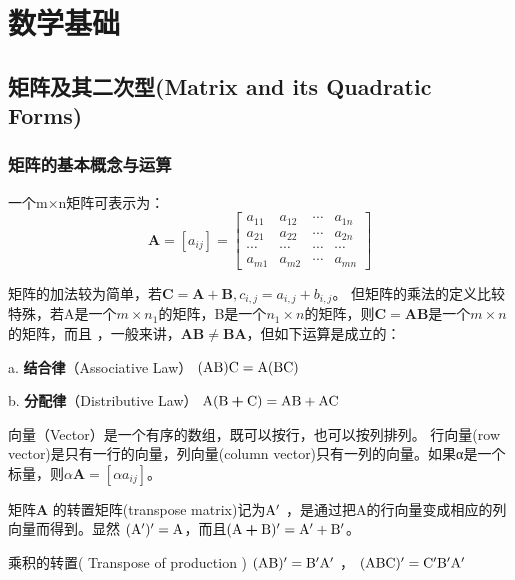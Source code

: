 \chapter{数学基础}
\section{ 矩阵及其二次型(Matrix and its Quadratic Forms) }
\subsection{矩阵的基本概念与运算}
一个m×n矩阵可表示为：
\vspace{-1em}
$$  \boldsymbol{A}=\left[a_{i j}\right]=\left[\begin{array}{llll}
a_{11} & a_{12} &\cdots & a_{1 n} \\
a_{21} & a_{22} & \cdots &a_{2 n} \\
\cdots & \cdots & \cdots & \cdots \\
a_{m 1} & a_{m 2} & \cdots & a_{m n}
\end{array}\right] $$

矩阵的加法较为简单，若$ \boldsymbol{C} = \boldsymbol{A} + \boldsymbol{B} , c_{i,j} = a_{i,j} + b_{i,j}$。 但矩阵的乘法的定义比较特殊，若A是一个$ m×n_1 $的矩阵，B是一个$ n_1×n $的矩阵，则$ \boldsymbol{C}=\boldsymbol{AB} $是一个$ m×n $的矩阵，而且 ，一般来讲，$ \boldsymbol{AB} \neq \boldsymbol{BA} $，但如下运算是成立的：

 {a. \bf 结合律}（Associative Law）   $  \rm (\boldsymbol{AB}) \boldsymbol{C}=\boldsymbol{A}(\boldsymbol{BC}) $
 
 {b. \bf 分配律}（Distributive Law）  $  \rm \boldsymbol{A}(\boldsymbol{B+C})=\boldsymbol{AB}+\boldsymbol{AC} $
 
 向量（Vector）是一个有序的数组，既可以按行，也可以按列排列。 行向量(row vector)是只有一行的向量，列向量(column vector)只有一列的向量。如果α是一个标量，则$ \alpha \boldsymbol{A}=\left[\alpha a_{i j}\right]  $。
 
 矩阵$ \boldsymbol{A} $ 的转置矩阵(transpose matrix)记为$ \rm {\boldsymbol{A}}^{\prime}$ ，是通过把A的行向量变成相应的列向量而得到。显然
 $ (\rm {\boldsymbol{A}}^{\prime} )^{\prime}= \boldsymbol{A} $，而且$ \rm (\boldsymbol{A + B})^{\prime}= {\boldsymbol{A}}^{\prime} + {\boldsymbol{B}}^{\prime} $。
 
 乘积的转置( Transpose of  production ) \quad  $ \rm (\boldsymbol{AB})^{\prime}= {\boldsymbol{B}}^{\prime} {\boldsymbol{A}}^{\prime}   $ ， 
        $ \rm (\boldsymbol{ABC})^{\prime}={\boldsymbol{C}}^{\prime}  {\boldsymbol{B}}^{\prime}  {\boldsymbol{A}}^{\prime}  $
 
